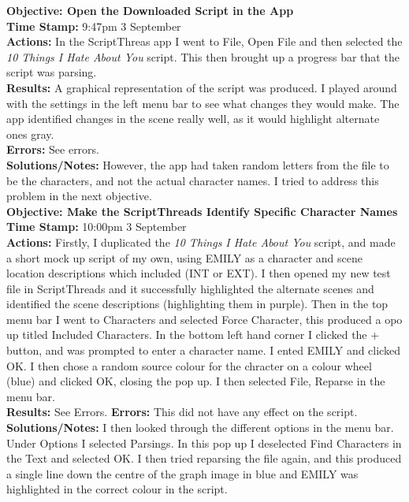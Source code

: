 \documentclass{article}
\begin{document}
\textbf{Objective: Open the Downloaded Script in the App}\\
\textbf{Time Stamp:} 9:47pm 3 September\\
\textbf{Actions:} In the ScriptThreas app I went to File, Open File and then selected the \textit{10 Things I Hate About You} script. This then brought up a progress bar that the script was parsing.\\
\textbf{Results:} A graphical representation of the script was produced. I played around with the settings in the left menu bar to see what changes they would make. The app identified changes in the scene really well, as it would highlight alternate ones gray.\\
\textbf{Errors:} See errors.\\
\textbf{Solutions/Notes:} However, the app had taken random letters from the file to be the characters, and not the actual character names. I tried to address this problem in the next objective.\\

\textbf{Objective: Make the ScriptThreads Identify Specific Character Names}\\
\textbf{Time Stamp:} 10:00pm 3 September\\
\textbf{Actions:} Firstly, I duplicated the \textit{10 Things I Hate About You} script, and made a short mock up script of my own, using EMILY as a character and scene location descriptions which included (INT or EXT). I then opened my new test file in ScriptThreads and it successfully highlighted the alternate scenes and identified the scene descriptions (highlighting them in purple). Then in the top menu bar I went to Characters and selected Force Character, this produced a opo up titled Included Characters. In the bottom left hand corner I clicked the + button, and was prompted to enter a character name. I ented EMILY and clicked OK. I then chose a random source colour for the chracter on a colour wheel (blue) and clicked OK, closing the pop up. I then selected File, Reparse in the menu bar.\\
\textbf{Results:} See Errors.
\textbf{Errors:} This did not have any effect on the script.\\
\textbf{Solutions/Notes:} I then looked through the different options in the menu bar. Under Options I selected Parsings. In this pop up I deselected Find Characters in the Text and selected OK. I then tried reparsing the file again, and this produced a single line down the centre of the graph image in blue and EMILY was highlighted in the correct colour in the script.\\
\end{document}
